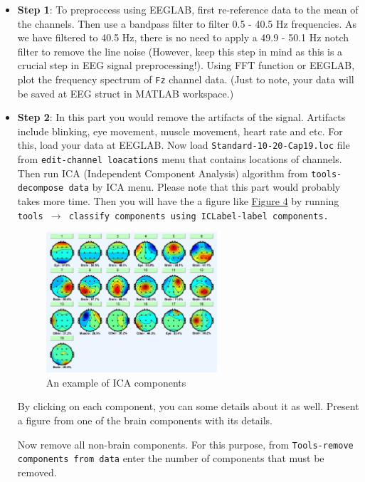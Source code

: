 \documentclass[12pt]{article}
\begin{document}
\begin{itemize}
	\item \textbf{Step 1}: To preproccess using EEGLAB, first re-reference data to the mean of the channels. Then use a bandpass filter to filter 0.5 - 40.5 Hz frequencies. As we have filtered to 40.5 Hz, there is no need to apply a 49.9 - 50.1 Hz notch filter to remove the line noise (However, keep this step in mind as this is a crucial step in EEG signal preprocessing!). Using FFT function or EEGLAB, plot the frequency spectrum of \texttt{Fz} channel data. (Just to note, your data will be saved at EEG struct in MATLAB workspace.)\\

	\item \textbf{Step 2}: In this part you would remove the artifacts of the signal. Artifacts include blinking, eye movement, muscle movement, heart rate and etc. For this, load your data at EEGLAB. Now load \texttt{Standard-10-20-Cap19.loc} file from \texttt{edit-channel loacations} menu that contains locations of channels. Then run ICA (Independent Component Analysis) algorithm from \texttt{tools-decompose data} by ICA menu. Please note that this part would probably takes more time. Then you will have the a figure like \hyperref[fig:fig4]{Figure 4} by running \texttt{tools $\rightarrow$ classify components using ICLabel-label components.}
	      \begin{figure}[h]
		      \center \includegraphics[scale=1,width=0.6\textwidth]{Images/brain_map.jpg}
		      \caption{An example of ICA components}
		      \label{fig:fig4}
	      \end{figure}
	      By clicking on each component, you can some details about it as well. Present a figure from one of the brain components with its details. \par
	      Now remove all non-brain components. For this purpose, from \texttt{Tools-remove components from data} enter the number of components that must be removed. \\


\end{itemize}
\end{document}
